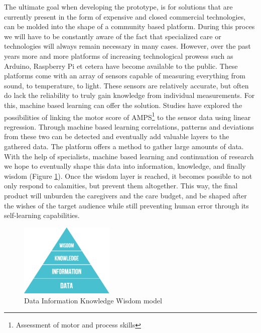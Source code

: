 \documentclass{below-ext}
\begin{document}
The ultimate goal when developing the prototype, is for solutions that are currently present in the form of expensive and closed commercial technologies, can be molded into the shape of a community based platform. During this proces we will have to be constantly aware of the fact that specialized care or technologies will always remain necessary in many cases. However, over the past years more and more platforms of increasing technological prowess such as Arduino, Raspberry Pi et cetera have become available to the public. These platforms come with an array of sensors capable of measuring everything from sound, to temperature, to light. These sensors are relatively accurate, but often do lack the reliability to truly gain knowledge from individual measurements. For this, machine based learning can offer the solution. Studies have explored the possibilities of linking the motor score of AMPS\footnote{Assessment of motor and process skills} to the sensor data using linear regression\cite{robben2012grandma}. Through machine based learning correlations, patterns and deviations from these two can be detected and eventually add valuable layers to the gathered data. The platform offers a method to gather large amounts of data. With the help of specialists, machine based learning and continuation of research we hope to eventually shape this data into information, knowledge, and finally wisdom (Figure \ref{fig:dikw}). Once the wisdom layer is reached, it becomes possible to not only respond to calamities, but prevent them altogether. This way, the final product will unburden the caregivers and the care budget, and  be shaped after the wishes of the target audience  while still preventing human error through its self-learning capabilities.
\begin{figure}
\centering
\includegraphics[width=0.4\textwidth]{dikw}
\caption{Data Information Knowledge Wisdom model}
\label{fig:dikw}
\end{figure}

\end{document}
